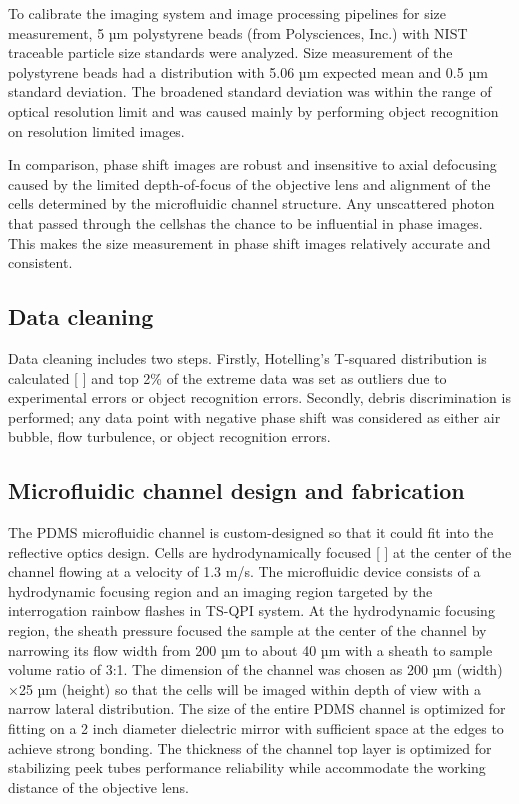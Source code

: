 \documentclass[aps,pra,reprint,superscriptaddress]{revtex4-1}
\begin{document}
To calibrate the imaging system and image processing pipelines for size measurement, 5 µm polystyrene beads (from Polysciences, Inc.) with NIST traceable particle size standards were analyzed. Size measurement of the polystyrene beads had a distribution with 5.06 µm expected mean and 0.5 µm standard deviation. The broadened standard deviation was within the range of optical resolution limit and was caused mainly by performing object recognition on resolution limited images.

In comparison, phase shift images are robust and insensitive to axial defocusing caused by the limited depth-of-focus of the objective lens and alignment of the cells determined by the microfluidic channel structure. Any unscattered photon that passed through the cellshas the chance to be influential in phase images. This makes the size measurement in phase shift images relatively accurate and consistent. 

\subsection{Data cleaning}

Data cleaning includes two steps. Firstly, Hotelling's T-squared distribution is calculated [ ] and top 2\% of the extreme data was set as outliers due to experimental errors or object recognition errors. Secondly, debris discrimination is performed; any data point with negative phase shift was considered as either air bubble, flow turbulence, or object recognition errors.

\subsection{Microfluidic channel design and fabrication}

The PDMS microfluidic channel is custom-designed so that it could fit into the reflective optics design. Cells are hydrodynamically focused [ ] at the center of the channel flowing at a velocity of 1.3 m/s. The microfluidic device consists of a hydrodynamic focusing region and an imaging region targeted by the interrogation rainbow flashes in TS-QPI system. At the hydrodynamic focusing region, the sheath pressure focused the sample at the center of the channel by narrowing its flow width from 200 µm to about 40 µm with a sheath to sample volume ratio of 3:1. The dimension of the channel was chosen as 200 µm (width) ×25 µm (height) so that the cells will be imaged within depth of view with a narrow lateral distribution. The size of the entire PDMS channel is optimized for fitting on a 2 inch diameter dielectric mirror with sufficient space at the edges to achieve strong bonding. The thickness of the channel top layer is optimized for stabilizing peek tubes performance reliability while accommodate the working distance of the objective lens. 
\end{document}
